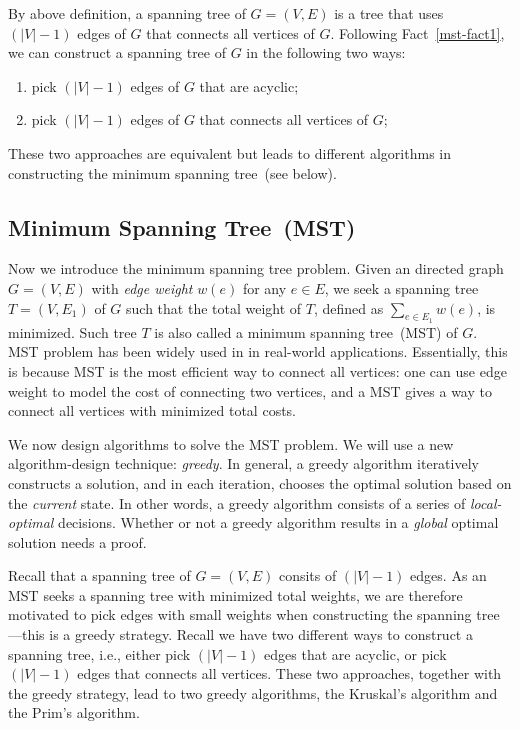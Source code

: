 By above definition, a spanning tree of $G = (V,E)$ is a tree that uses $(|V| - 1)$ edges
of $G$ that connects all vertices of $G$.
Following Fact~\ref{mst-fact1}, we can construct a spanning tree of $G$
in the following two ways:
\vspace*{-\topsep}
\begin{enumerate}
\item pick $(|V|-1)$ edges of $G$ that are acyclic;
\item pick $(|V|-1)$ edges of $G$ that connects all vertices of $G$;
\end{enumerate}
These two approaches are equivalent but leads to different algorithms
in constructing the minimum spanning tree~(see below).


\subsection*{Minimum Spanning Tree~(MST)}

Now we introduce the minimum spanning tree problem.
Given an directed graph $G = (V, E)$ with \emph{edge weight} $w(e)$ for any $e\in E$,
we seek a spanning tree $T = (V, E_1)$ of $G$ such that 
the total weight of $T$, defined as $\sum_{e\in E_1} w(e)$, is minimized.
Such tree $T$ is also called a minimum spanning tree~(MST) of $G$.
MST problem has been widely used in in real-world applications.
Essentially, this is because MST is the most efficient way to connect all
vertices: one can use edge weight to model the cost of connecting
two vertices, and a MST gives a way to connect all vertices with minimized total costs.

We now design algorithms to solve the MST problem.
We will use a new algorithm-design technique: \emph{greedy}.
In general, a greedy algorithm iteratively constructs a solution,
and in each iteration, chooses the optimal solution based on the \emph{current} state.
In other words, a greedy algorithm consists of a series of \emph{local-optimal} decisions.
Whether or not a greedy algorithm results in a \emph{global} optimal solution
needs a proof.

Recall that a spanning tree of $G = (V, E)$ consits of $(|V| - 1)$ edges.
As an MST seeks a spanning tree with minimized total weights,
we are therefore motivated to pick edges with small weights when constructing
the spanning tree---this is a greedy strategy.
Recall we have two different ways to construct a spanning tree, i.e., 
either pick $(|V|-1)$ edges that are acyclic,
or pick $(|V|-1)$ edges that connects all vertices.
These two approaches, together with the greedy strategy,
lead to two greedy algorithms, the Kruskal's algorithm and the Prim's algorithm.

